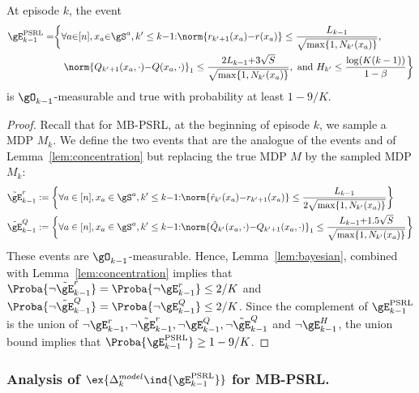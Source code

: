 \begin{lem}
    \label{lem:concentration_psrl}
    At episode $k$, the event
    \begin{align*}
        \gE^\text{PSRL}_{k-1} = &\bigg\{ \forall a{\in}[n], x_a{\in}\gS^a, k'\le k{-}1{:}
            \norm{r_{k'+1}(x_a){-}r(x_a)} \le\frac{L_{k-1}}{\sqrt{\max\{1,N_{k'}(x_a)\} }}, \\
            &\quad\norm{Q_{k'+1}(x_a,\cdot) {-}Q(x_a,\cdot)}_1 \le\frac{2L_{k-1}{+}3\sqrt{S}}{\sqrt{\max\{1,N_{k'}(x_a)\} }}, \text{ and } H_{k'}\le \frac{\log(K(k-1))}{1-\beta} \bigg\}
    \end{align*}
    is $\gO_{k-1}$-measurable and true with probability at least $1-9/K$.
\end{lem}

\begin{proof}
    Recall that for MB-PSRL, at the beginning of episode $k$, we sample a MDP $M_{k}$. We define the two events that are the analogue of the events  and  of Lemma~\ref{lem:concentration} but replacing the true MDP $M$ by the sampled MDP $M_{k}$: 
    \begin{align*}
        &\tilde{\gE}_{k-1}^r:= \bigg\{\forall a\in[n], x_a\in\gS^a, k'\le k{-}1{:} \norm{\hat{r}_{k'}(x_a){-}r_{k'+1}(x_a)} \le \frac{L_{k-1}}{2\sqrt{\max\{1,N_{k'}(x_a)\} }}\bigg\} \\
        &\tilde{\gE}_{k-1}^Q:= \bigg\{\forall a\in[n], x_a\in\gS^a, k'\le k{-}1{:} \norm{\hat{Q}_{k'}(x_a,\cdot){-}Q_{k'+1}(x_a, \cdot)}_1 \le \frac{L_{k-1}{+}1.5\sqrt{S}}{\sqrt{\max\{1,N_{k'}(x_a)\} }}\bigg\} 
    \end{align*}
    These events are $\gO_{k-1}$-measurable. Hence, Lemma~\ref{lem:bayesian}, combined with Lemma~\ref{lem:concentration} implies that $\Proba{ \lnot \tilde{\gE}_{k-1}^r} =\Proba{ \lnot \gE_{k-1}^r}\le 2/K$ and $\Proba{\lnot \tilde{\gE}_{k-1}^Q}=\Proba{ \lnot \gE_{k-1}^Q}\le 2/K$. Since the complement of $\gE_{k-1}^\text{PSRL}$ is the union of $\lnot \gE_{k-1}^r, \lnot \tilde{\gE}_{k-1}^r, \lnot \gE_{k-1}^Q, \lnot \tilde{\gE}_{k-1}^Q$ and $\lnot \gE_{k-1}^H$, the union bound implies that $\Proba{\gE^\text{PSRL}_{k-1}}\ge1-9/K$.
\end{proof}

\subsubsection{Analysis of $\ex{\Delta^{model}_k \ind{\gE_{k-1}^\text{PSRL}}}$ for MB-PSRL.}

